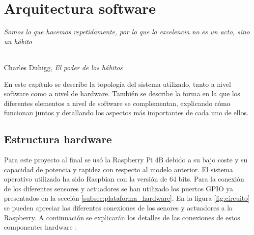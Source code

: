 \chapter{Arquitectura software}
\label{cap:capitulo5}

\begin{flushright}
\begin{minipage}[]{10cm}
\emph{Somos lo que hacemos repetidamente, por lo que la excelencia no es un acto, sino un hábito}\\
\end{minipage}\\

Charles Duhigg, \textit{El poder de los hábitos}\\
\end{flushright}

\vspace{1cm}


En este capítulo se describe la topología del sistema utilizado, tanto a nivel software como a nivel de hardware. También se describe la forma en la que los diferentes elementos a nivel de software se complementan, explicando cómo funcionan juntos y detallando los aspectos más importantes de cada uno de ellos.


\section{Estructura hardware}
\label{sec:estructura_hardware}


Para este proyecto al final se usó la Raspberry Pi 4B debido a su bajo coste y su capacidad de potencia y rapidez con respecto al modelo anterior. El sistema operativo utilizado ha sido Raspbian con la versión de 64 bits. Para la conexión de los diferentes sensores y actuadores se han utilizado los puertos GPIO ya presentados en la sección \ref{subsec:plataforma_hardware}. En la figura \ref{fig:circuito} se pueden apreciar las diferentes conexiones de los senores y actuadores a la Raspberry. A continuación se explicarán los detalles de las conexiones de estos componentes hardware :


